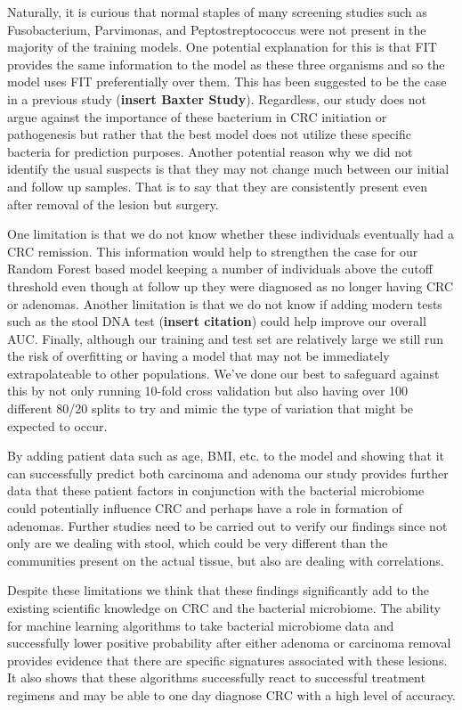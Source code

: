 \documentclass[12pt,]{article}
\begin{document}
Naturally, it is curious that normal staples of many screening studies
such as Fusobacterium, Parvimonas, and Peptostreptococcus were not
present in the majority of the training models. One potential
explanation for this is that FIT provides the same information to the
model as these three organisms and so the model uses FIT preferentially
over them. This has been suggested to be the case in a previous study
(\textbf{insert Baxter Study}). Regardless, our study does not argue
against the importance of these bacterium in CRC initiation or
pathogenesis but rather that the best model does not utilize these
specific bacteria for prediction purposes. Another potential reason why
we did not identify the usual suspects is that they may not change much
between our initial and follow up samples. That is to say that they are
consistently present even after removal of the lesion but surgery.

One limitation is that we do not know whether these individuals
eventually had a CRC remission. This information would help to
strengthen the case for our Random Forest based model keeping a number
of individuals above the cutoff threshold even though at follow up they
were diagnosed as no longer having CRC or adenomas. Another limitation
is that we do not know if adding modern tests such as the stool DNA test
(\textbf{insert citation}) could help improve our overall AUC. Finally,
although our training and test set are relatively large we still run the
risk of overfitting or having a model that may not be immediately
extrapolateable to other populations. We've done our best to safeguard
against this by not only running 10-fold cross validation but also
having over 100 different 80/20 splits to try and mimic the type of
variation that might be expected to occur.

By adding patient data such as age, BMI, etc. to the model and showing
that it can successfully predict both carcinoma and adenoma our study
provides further data that these patient factors in conjunction with the
bacterial microbiome could potentially influence CRC and perhaps have a
role in formation of adenomas. Further studies need to be carried out to
verify our findings since not only are we dealing with stool, which
could be very different than the communities present on the actual
tissue, but also are dealing with correlations.

Despite these limitations we think that these findings significantly add
to the existing scientific knowledge on CRC and the bacterial
microbiome. The ability for machine learning algorithms to take
bacterial microbiome data and successfully lower positive probability
after either adenoma or carcinoma removal provides evidence that there
are specific signatures associated with these lesions. It also shows
that these algorithms successfully react to successful treatment
regimens and may be able to one day diagnose CRC with a high level of
accuracy.
\end{document}
